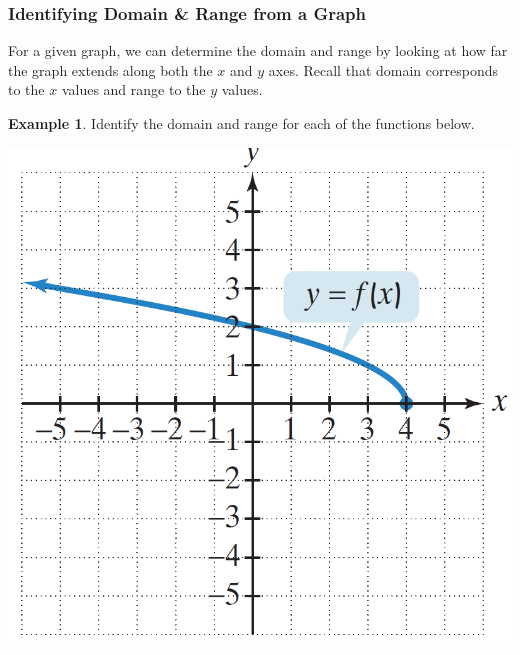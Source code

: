 \documentclass[addpoints,12pt]{exam}
\theoremstyle{definition}
\newtheorem{example}{Example}[subsection]
\begin{document}
\newpage

\subsubsection*{Identifying Domain \& Range from a Graph}

For a given graph, we can determine the domain and range by looking at how far the graph extends along both the $x$ and $y$ axes. Recall that domain corresponds to the $x$ values and range to the $y$ values.

\begin{example}
Identify the domain and range for each of the functions below.

\begin{minipage}{.5\textwidth}
\includegraphics[scale=.3]{images/dom_rang_01}
\end{minipage}%
\begin{minipage}{.5\textwidth}

\end{minipage}
\end{example}
\end{document}
